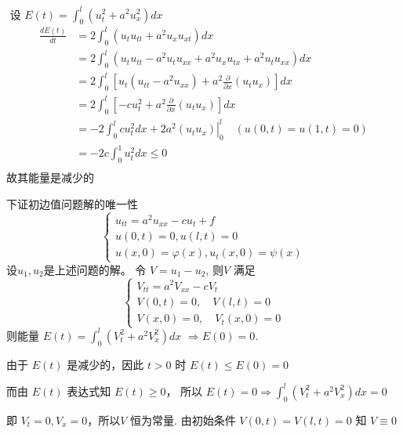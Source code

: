 \begin{questions}
\begin{solution}
$\text { 设 } E(t)=\int_{0}^{l}\left(u_{t}^{2}+a^{2} u_{x}^{2}\right) d x $
$$
\begin{aligned}
\frac{d E(t)}{d t}&=2 \int_{0}^{l}\left(u_{t} u_{t t}+a^{2} u_{x} u_{x t}\right) d x \\
&=2 \int_{0}^{l}\left(u_{t} u_{t t}-a^{2} u_{t} u_{x x}+a^{2} u_{x} u_{t x}+a^{2} u_{t} u_{x x}\right) d x \\
&=2 \int_{0}^{l}\left[u_{t}\left(u_{tt}-a^{2} u_{x x}\right)+a^{2} \frac{\partial}{\partial x}\left(u_{t} u_{x}\right)\right] d x \\
&=2 \int_{0}^{l}\left[-c u_{t}^{2}+a^{2} \frac{\partial}{\partial x}\left(u_{t} u_{x}\right)\right] d x  \\
&=-2 \int_{0}^{l}cu_{t}^{2} d x+2\left.a^{2}\left(u_{t} u_{x}\right)\right|_{0} ^{l} \quad \left(u(0, t)=u(1, t)=0\right)\\
&=-2 c \int_{0}^{1} u_{t}^{2} d x \leqslant 0 \\
\end{aligned}
$$
 故其能量是减少的 

下证初边值问题解的唯一性
$$
\left\{\begin{array}{l}
u_{t t}=a^{2} u_{x x}-c u_{t}+f \\
u(0, t)=0, u(l, t)=0 \\
u(x, 0)=\varphi(x), u_{t}(x, 0)=\psi(x)
\end{array}\right.
$$
设$u_1, u_2$是上述问题的解。
令 $ V=u_{1}-u_{2} $, 则$V $ 满足
$$
\left\{\begin{array}{l}
V_{t t}=a^{2} V_{x x}-c V_{t} \\
V(0, t)=0, \quad V(l, t)=0 \\
V(x, 0)=0 , \quad V_{t}(x, 0)=0
\end{array}\right.
$$
则能量 $ E(t)=\int_{0}^{l}\left(V_{t}^{2}+a^{2} V_{x}^{2}\right) d x $
$\Rightarrow E(0)=0$.

由于 $ E(t) $ 是减少的，因此 $ t>0 $ 时 $ E(t) \leqslant E(0)=0 $

而由 $ E(t) $ 表达式知 $ E(t) \geqslant 0 $，
所以 $ E(t)=0 \Rightarrow \int_{0}^{l}\left(V_{t}^{2}+a^{2} V_{x}^{2}\right) d x=0 $

即 $ V_{t}=0, V_{x}=0 $，所以$V$ 恒为常量. 
由初始条件 $ V(0, t)=V(l, t)=0 $
知 $ V \equiv 0 $ 


\end{solution}
\end{questions}
